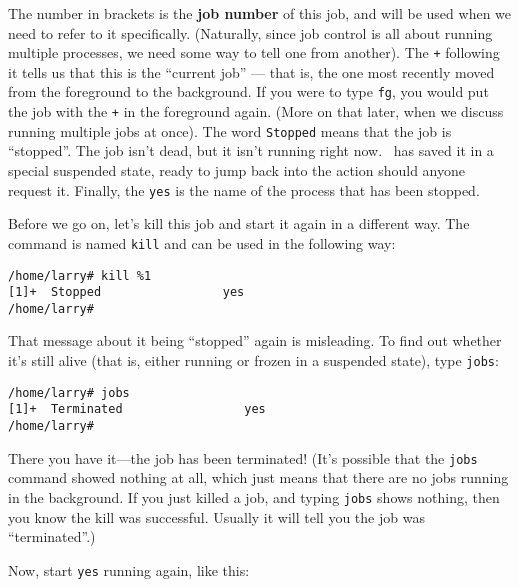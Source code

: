         The number in brackets is the  {\bf job
number} of this job, and will be used when we need to refer to it
specifically.  (Naturally, since job control is all about running
multiple processes, we need some way to tell one from another).  The
{\tt +} following it tells us that this is the ``current job'' ---
that is, the one most recently moved from the foreground to the
background.  If you were to type {\tt fg}, you would put the job with
the {\tt +} in the foreground again.  (More on that later, when we discuss
running multiple jobs at once).  The word {\tt Stopped} means that the
job is ``stopped''.  The job isn't dead, but it isn't running right
now.  \linux\ has saved it in a special suspended state, ready to jump
back into the action should anyone request it.  Finally, the {\tt yes}
is the name of the process that has been stopped.

        Before we go on, let's kill this job and start it again in a
different way.  The command is named  {\tt kill} and
can be used in the following way:

\begin{screen}\begin{verbatim}
/home/larry# kill %1
[1]+  Stopped                 yes
/home/larry#
\end{verbatim}\end{screen}

        That message about it being ``stopped'' again is misleading.
To find out whether it's still alive (that is, either running or
frozen in a suspended state), type  {\tt jobs}:

\begin{screen}\begin{verbatim}
/home/larry# jobs
[1]+  Terminated                 yes
/home/larry#
\end{verbatim}\end{screen}
        
        There you have it---the job has been 
terminated!  (It's possible that the {\tt jobs} command showed nothing
at all, which just means that there are no jobs running in the
background.  If you just killed a job, and typing {\tt jobs} shows
nothing, then you know the kill was successful.  Usually it will tell
you the job was ``terminated''.)

        Now, start {\tt yes} running again, like this:

